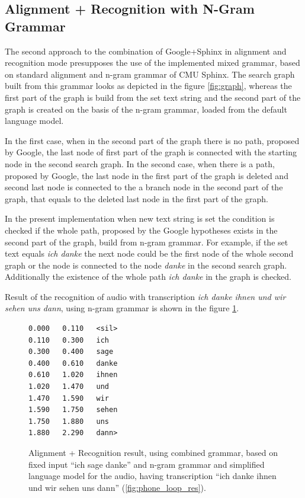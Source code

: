 \subsection {Alignment + Recognition with N-Gram Grammar}
The second approach to the combination of Google+Sphinx in alignment
and recognition mode presupposes the use of the implemented mixed grammar, based
on standard alignment and n-gram grammar of CMU Sphinx.  The search graph built
from this grammar looks as depicted in the figure \ref{fig:graph}, whereas the
first part of the graph is build from the set text string and the second part of
the graph is created on the basis of the n-gram grammar, loaded from the default
language model. 

In the first case, when in the second part of the graph there is no path,
proposed by Google, the last node of first part of the graph is connected with the
starting node in the second search graph. In the second case, when there is a
path, proposed by Google, the last node in the first part of the graph  is
deleted and second last node is connected to the a branch node in the second
part of the graph, that equals to the deleted last node in the first part of
the graph. 

In the present implementation when new text string is set  the
condition is checked if the whole path, proposed by the Google hypotheses exists in the second part of the
graph, build from n-gram grammar. For  example, if the set text equals \textit
{ich danke} the next node could be the first node of the whole second graph or the node 
 is connected to the node \textit {danke} in the second search graph.
Additionally the existence of the whole path  \textit
{ich danke} in the graph is checked. 

Result of the recognition of audio with transcription \textit {ich danke ihnen
und wir sehen uns dann}, using n-gram grammar   is shown in
the figure  \ref{fig:ngram_res}.

\begin{figure}[htbp]
 \centering 
\begin{center}
\begin{lstlisting}[frame=single]
0.000	0.110	<sil>
0.110	0.300	ich
0.300	0.400	sage
0.400	0.610	danke
0.610	1.020	ihnen
1.020	1.470	und
1.470	1.590	wir
1.590	1.750	sehen
1.750	1.880	uns
1.880	2.290	dann>
\end{lstlisting}
\end{center}
 \caption{Alignment + Recognition result, using combined grammar, based on
 fixed input ``ich sage danke'' and n-gram grammar and simplified language
 model for the audio, having transcription ``ich danke ihnen und wir sehen uns
 dann'' (\ref{fig:phone_loop_res}).}
  \label{fig:ngram_res}
\end {figure}
















